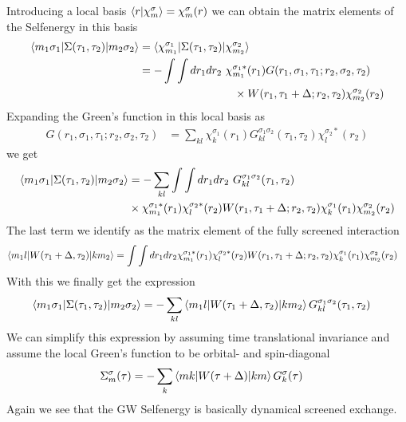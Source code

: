 \documentclass[12pt,a4paper]{scrartcl}
\numberwithin{equation}{section}
\begin{document}
Introducing a local basis 
$\braket{r|\chi_{m}^{\sigma}}=\chi_{m}^{\sigma}(r)$ we can
obtain the matrix elements of the Selfenergy in this basis
\begin{align}
 \braket{m_1\sigma_1 | \Sigma(\tau_1,\tau_2) | m_2\sigma_2 } 
 &= \braket{\chi_{m_1}^{\sigma_1} | \Sigma(\tau_1,\tau_2) | \chi_{m_2}^{\sigma_2} }  \\
 &= -\int\int dr_1dr_2 \  \chi_{m_1}^{\sigma_1*}(r_1) G(r_1,\sigma_1,\tau_1;r_2,\sigma_2,\tau_2)\\
           & \hspace{3cm} \times W(r_1,\tau_1+\Delta;r_2,\tau_2)\chi_{m_2}^{\sigma_2}(r_2)
\end{align}
Expanding the Green's function in this local basis as
\begin{align}
 G(r_1,\sigma_1,\tau_1;r_2,\sigma_2,\tau_2)
 &= \sum_{kl} \chi_{k}^{\sigma_1}(r_1) G^{\sigma_1\sigma_2}_{kl}(\tau_1,\tau_2)\chi_{l}^{\sigma_2*}(r_2)
\end{align}
we get
\begin{align}
 \braket{m_1\sigma_1 | \Sigma(\tau_1,\tau_2) | m_2\sigma_2 } 
 &= -\sum_{kl}\int\int dr_1dr_2 \  G^{\sigma_1\sigma_2}_{kl}(\tau_1,\tau_2)\\
           & \hspace{0cm} \times \chi_{m_1}^{\sigma_1*}(r_1)\chi_{l}^{\sigma_2*}(r_2) W(r_1,\tau_1+\Delta;r_2,\tau_2) \chi_{k}^{\sigma_1}(r_1) \chi_{m_2}^{\sigma_2}(r_2)
\end{align}
The last term we identify as the matrix element of the fully
screened interaction
\begin{align}
 \braket{m_1 l | W(\tau_1+\Delta,\tau_2) | k m_2} 
 &=\int\int dr_1dr_2  \chi_{m_1}^{\sigma_1*}(r_1)\chi_{l}^{\sigma_2*}(r_2) W(r_1,\tau_1+\Delta;r_2,\tau_2) \chi_{k}^{\sigma_1}(r_1) \chi_{m_2}^{\sigma_2}(r_2)
\end{align}
With this we finally get the expression
\begin{align}
 \braket{m_1\sigma_1 | \Sigma(\tau_1,\tau_2) | m_2\sigma_2 } 
 &= -\sum_{kl} \braket{m_1 l | W(\tau_1+\Delta,\tau_2) | k m_2}G^{\sigma_1\sigma_2}_{kl}(\tau_1,\tau_2)
\end{align}
We can simplify this expression by assuming time translational
invariance and assume the local Green's function to
be orbital- and spin-diagonal
\begin{align}
  \Sigma_m^{\sigma}(\tau) 
 &= -\sum_{k} \braket{m k | W(\tau+\Delta)|k m} G^{\sigma}_{k}(\tau)
\end{align}
Again we see that the GW Selfenergy is basically dynamical
screened exchange. 
\end{document}
